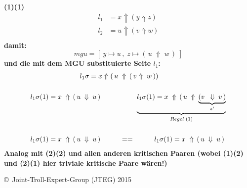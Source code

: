 \documentclass{article}
\begin{document}
		\textbf{(1)(1)}
			\begin{align*}
				l_1 &= x \Uparrow ( y \Uparrow z)  \\
				l_2 &= u \Uparrow ( v \Uparrow w)  \\
			\end{align*}
		\textbf{damit:}
			\[
				mgu = [\;y \mapsto u\,,\;z \mapsto (\,u\;\Uparrow\;w\,)\;]
			\]
		\textbf{und die mit dem MGU substituierte Seite $l_1$:}\\
			\begin{align*}
				l_1\sigma = x \Uparrow (\,u\;&\Uparrow\,(\,v\Uparrow\;w\,))\\ \\
				l_1\sigma (1) = x\;\Uparrow \, ( \, u \; \Downarrow \; u\,)
				\hspace{1cm}&\hspace{8mm}
				\underbrace{l_1\sigma (1) = x\;\Uparrow \, ( \, u \; \Uparrow \,\underbrace{(v\;\;\Downarrow\;v\,)}_{z'}}_{Regel\;(1)} \\\\
				l_1\sigma (1) = x\;\Uparrow \, ( \, u \; \Downarrow \; u\,)
				\hspace{1cm}&==\hspace{10mm}			
				l_1\sigma (1) = x\;\Uparrow \, ( \, u \; \Downarrow \; u\,) \\
			\end{align*}
		\textbf{Analog mit (2)(2) und allen anderen kritischen Paaren (wobei (1)(2) und (2)(1) hier triviale kritische Paare w\"aren!)}
		
		
		
		
		
		
		
		
		
	
		
		
		
	\begin{tiny}
	\copyright\ Joint-Troll-Expert-Group (JTEG) 2015
	\end{tiny}
\end{document}
